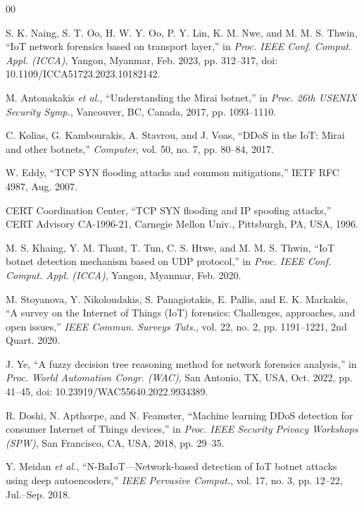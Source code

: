 \documentclass[conference]{IEEEtran}
\begin{document}
\begin{thebibliography}{00}

 S. K. Naing, S. T. Oo, H. W. Y. Oo, P. Y. Lin, K. M. Nwe, and M. M. S. Thwin, ``IoT network forensics based on transport layer,'' in \emph{Proc. IEEE Conf. Comput. Appl. (ICCA)}, Yangon, Myanmar, Feb. 2023, pp. 312--317, doi: 10.1109/ICCA51723.2023.10182142.

 M. Antonakakis \emph{et al.}, ``Understanding the Mirai botnet,'' in \emph{Proc. 26th USENIX Security Symp.}, Vancouver, BC, Canada, 2017, pp. 1093--1110.

 C. Kolias, G. Kambourakis, A. Stavrou, and J. Voas, ``DDoS in the IoT: Mirai and other botnets,'' \emph{Computer}, vol. 50, no. 7, pp. 80--84, 2017.

 W. Eddy, ``TCP SYN flooding attacks and common mitigations,'' IETF RFC 4987, Aug. 2007.

 CERT Coordination Center, ``TCP SYN flooding and IP spoofing attacks,'' CERT Advisory CA-1996-21, Carnegie Mellon Univ., Pittsburgh, PA, USA, 1996.

 M. S. Khaing, Y. M. Thant, T. Tun, C. S. Htwe, and M. M. S. Thwin, ``IoT botnet detection mechanism based on UDP protocol,'' in \emph{Proc. IEEE Conf. Comput. Appl. (ICCA)}, Yangon, Myanmar, Feb. 2020.

 M. Stoyanova, Y. Nikoloudakis, S. Panagiotakis, E. Pallis, and E. K. Markakis, ``A survey on the Internet of Things (IoT) forensics: Challenges, approaches, and open issues,'' \emph{IEEE Commun. Surveys Tuts.}, vol. 22, no. 2, pp. 1191--1221, 2nd Quart. 2020.

 J. Ye, ``A fuzzy decision tree reasoning method for network forensics analysis,'' in \emph{Proc. World Automation Congr. (WAC)}, San Antonio, TX, USA, Oct. 2022, pp. 41--45, doi: 10.23919/WAC55640.2022.9934389.

 R. Doshi, N. Apthorpe, and N. Feamster, ``Machine learning DDoS detection for consumer Internet of Things devices,'' in \emph{Proc. IEEE Security Privacy Workshops (SPW)}, San Francisco, CA, USA, 2018, pp. 29--35.

 Y. Meidan \emph{et al.}, ``N-BaIoT---Network-based detection of IoT botnet attacks using deep autoencoders,'' \emph{IEEE Pervasive Comput.}, vol. 17, no. 3, pp. 12--22, Jul.--Sep. 2018.


\end{thebibliography}
\end{document}
